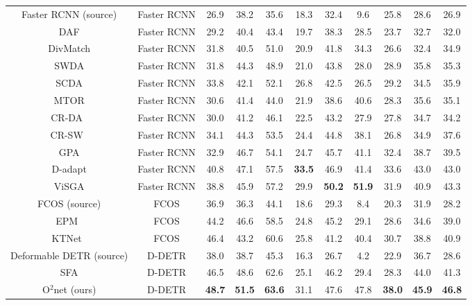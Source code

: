 \documentclass[sigconf]{acmart}
\begin{document}
\begin{table*}[t]
\begin{tabular}{c|c|cccccccc|c}
                \hline
                Faster RCNN (source) & Faster RCNN & 26.9 & 38.2 & 35.6 & 18.3 & 32.4 & 9.6 & 25.8 & 28.6 & 26.9 \\
                DAF \cite{dafaster} & Faster RCNN & 29.2 & 40.4 & 43.4 & 19.7 & 38.3 & 28.5 & 23.7 & 32.7 & 32.0 \\
                DivMatch \cite{divmatch} & Faster RCNN & 31.8 & 40.5 & 51.0 & 20.9 & 41.8 & 34.3 & 26.6 & 32.4 & 34.9 \\
                SWDA \cite{strong-weak} & Faster RCNN & 31.8 & 44.3 & 48.9 & 21.0 & 43.8 & 28.0 & 28.9 & 35.8 & 35.3 \\
                SCDA \cite{scda} & Faster RCNN & 33.8 & 42.1 & 52.1 & 26.8 & 42.5 & 26.5 & 29.2 & 34.5 & 35.9 \\
                MTOR \cite{mtor} & Faster RCNN & 30.6 & 41.4 & 44.0 & 21.9 & 38.6 & 40.6 & 28.3 & 35.6 & 35.1 \\
                CR-DA~\cite{xu2020exploring} & Faster RCNN & 30.0 & 41.2 & 46.1 & 22.5 & 43.2 & 27.9 & 27.8 & 34.7 & 34.2 \\
                CR-SW~\cite{xu2020exploring} & Faster RCNN & 34.1 & 44.3 & 53.5 & 24.4 & 44.8 & 38.1 & 26.8 & 34.9 & 37.6 \\
                GPA \cite{gpadet} & Faster RCNN & 32.9 & 46.7 & 54.1 & 24.7 & 45.7 & 41.1 & 32.4 & 38.7 & 39.5 \\
                D-adapt \cite{jiang2021decoupled} & Faster RCNN & 40.8 & 47.1 & 57.5 & \textbf{33.5} & 46.9 & 41.4 & 33.6 & 43.0 & 43.0 \\
                ViSGA \cite{ViSGA} & Faster RCNN & 38.8 & 45.9 & 57.2 & 29.9 & \textbf{50.2} & \textbf{51.9} & 31.9 & 40.9 & 43.3 \\
                \hline
                FCOS \cite{tian2019fcos} (source) & FCOS & 36.9 & 36.3 & 44.1 & 18.6 & 29.3 & 8.4 & 20.3 & 31.9 & 28.2 \\
                EPM~\cite{hsu2020every} & FCOS & 44.2 & 46.6 & 58.5 & 24.8 & 45.2 & 29.1 & 28.6 & 34.6 & 39.0 \\
                KTNet~\cite{KTNet} & FCOS & 46.4 & 43.2 & 60.6 & 25.8 & 41.2 &40.4 & 30.7 & 38.8 & 40.9 \\
                \hline
                Deformable DETR (source) & D-DETR & 38.0 & 38.7 & 45.3 & 16.3 & 26.7 & 4.2 & 22.9 & 36.7  & 28.6 \\
                SFA \cite{wang2021exploring} & D-DETR & 46.5 & 48.6 & 62.6 & 25.1 & 46.2 & 29.4 & 28.3 & 44.0 & 41.3 \\
                O$^2$net (ours) & D-DETR & \textbf{48.7} & \textbf{51.5} & \textbf{63.6} & 31.1 & 47.6 & 47.8 & \textbf{38.0} & \textbf{45.9} & \textbf{46.8} \\
                \bottomrule[1.0pt]
            \end{tabular}
\vspace{-2mm}
\end{table*}
    
\end{document}
